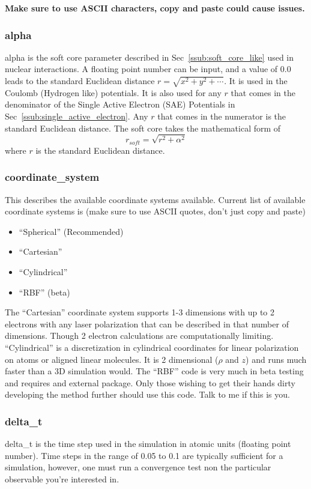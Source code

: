 \documentclass{article}
\begin{document}
\textbf{Make sure to use ASCII characters, copy and paste could cause issues.}

\subsubsection{alpha}
alpha is the soft core parameter described in Sec~\ref{ssub:soft_core_like} used in nuclear interactions. A floating point number can be input, and a value of 0.0 leads to the standard Euclidean distance $r=\sqrt{x^2+y^2+\cdots}$. It is used in the Coulomb (Hydrogen like) potentials. It is also used for any $r$ that comes in the denominator of the Single Active Electron (SAE) Potentials in Sec~\ref{ssub:single_active_electron}. Any $r$ that comes in the numerator is the standard Euclidean distance. The soft core takes the mathematical form of
\begin{equation}
  r_{soft} = \sqrt{r^2 + \alpha^2}
\end{equation}
where $r$ is the standard Euclidean distance.

\subsubsection{coordinate\_system}
This describes the available coordinate systems available. Current list of available coordinate systems is (make sure to use ASCII quotes, don't just copy and paste)
\begin{itemize}
  \item ``Spherical'' (Recommended)
  \item ``Cartesian''
  \item ``Cylindrical''
  \item ``RBF'' (beta)
\end{itemize}
The ``Cartesian'' coordinate system supports 1-3 dimensions with up to 2 electrons with any laser polarization that can be described in that number of dimensions. Though 2 electron calculations are computationally limiting. ``Cylindrical'' is a discretization in cylindrical coordinates for linear polarization on atoms or aligned linear molecules. It is 2 dimensional ($\rho$ and $z$) and runs much faster than a 3D simulation would. The ``RBF'' code is very much in beta testing and requires and external package. Only those wishing to get their hands dirty developing the method further should use this code. Talk to me if this is you.

\subsubsection{delta\_t}
delta\_t is the time step used in the simulation in atomic units (floating point number). Time steps in the range of 0.05 to 0.1 are typically sufficient for a simulation, however, one must run a convergence test non the particular observable you're interested in.
\end{document}
